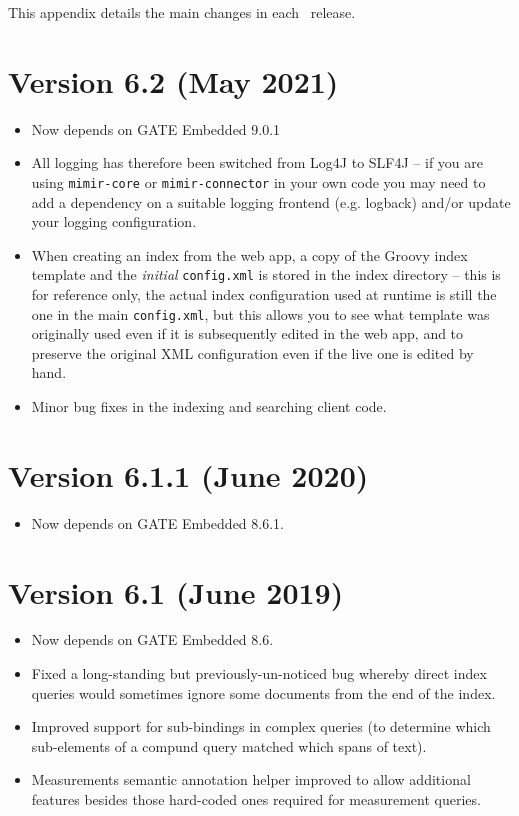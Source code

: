 This appendix details the main changes in each \Mimir\ release.

\section{Version 6.2 (May 2021)}
\begin{itemize}
\item Now depends on GATE Embedded 9.0.1
\item All logging has therefore been switched from Log4J to SLF4J -- if you are
  using \texttt{mimir-core} or \texttt{mimir-connector} in your own code you
  may need to add a dependency on a suitable logging frontend (e.g. logback)
  and/or update your logging configuration.
\item When creating an index from the web app, a copy of the Groovy index
  template and the \emph{initial} \texttt{config.xml} is stored in the index
  directory -- this is for reference only, the actual index configuration used
  at runtime is still the one in the main \texttt{config.xml}, but this allows
  you to see what template was originally used even if it is subsequently
  edited in the web app, and to preserve the original XML configuration even if
  the live one is edited by hand.
\item Minor bug fixes in the indexing and searching client code.
\end{itemize}

\section{Version 6.1.1 (June 2020)}
\begin{itemize}
\item Now depends on GATE Embedded 8.6.1.
\end{itemize}

\section{Version 6.1 (June 2019)}
\begin{itemize}
\item Now depends on GATE Embedded 8.6.
\item Fixed a long-standing but previously-un-noticed bug whereby direct index
  queries would sometimes ignore some documents from the end of the index.
\item Improved support for sub-bindings in complex queries (to determine which
  sub-elements of a compund query matched which spans of text).
\item Measurements semantic annotation helper improved to allow additional
  features besides those hard-coded ones required for measurement queries.
\end{itemize}

